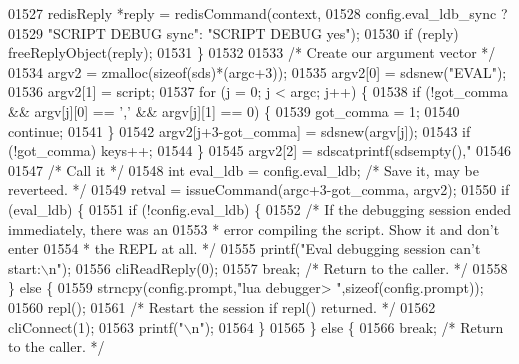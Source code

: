 \begin{DoxyCode}
{{{{{{{{{{{{{{{{{{{{{{{{{{{{{{{{{{{{{{{01527             redisReply *reply = redisCommand(context,
01528                     config.eval\_ldb\_sync ?
01529                     \textcolor{stringliteral}{"SCRIPT DEBUG sync"}: \textcolor{stringliteral}{"SCRIPT DEBUG yes"});
01530             \textcolor{keywordflow}{if} (reply) freeReplyObject(reply);
01531         \}
01532 
01533         \textcolor{comment}{/* Create our argument vector */}
01534         argv2 = zmalloc(\textcolor{keyword}{sizeof}(sds)*(argc+3));
01535         argv2[0] = sdsnew(\textcolor{stringliteral}{"EVAL"});
01536         argv2[1] = script;
01537         \textcolor{keywordflow}{for} (j = 0; j < argc; j++) \{
01538             \textcolor{keywordflow}{if} (!got\_comma && argv[j][0] == \textcolor{stringliteral}{','} && argv[j][1] == 0) \{
01539                 got\_comma = 1;
01540                 \textcolor{keywordflow}{continue};
01541             \}
01542             argv2[j+3-got\_comma] = sdsnew(argv[j]);
01543             \textcolor{keywordflow}{if} (!got\_comma) keys++;
01544         \}
01545         argv2[2] = sdscatprintf(sdsempty(),\textcolor{stringliteral}{"%
01546 
01547         \textcolor{comment}{/* Call it */}
01548         \textcolor{keywordtype}{int} eval\_ldb = config.eval\_ldb; \textcolor{comment}{/* Save it, may be reverteed. */}
01549         retval = issueCommand(argc+3-got\_comma, argv2);
01550         \textcolor{keywordflow}{if} (eval\_ldb) \{
01551             \textcolor{keywordflow}{if} (!config.eval\_ldb) \{
01552                 \textcolor{comment}{/* If the debugging session ended immediately, there was an}
01553 \textcolor{comment}{                 * error compiling the script. Show it and don't enter}
01554 \textcolor{comment}{                 * the REPL at all. */}
01555                 printf(\textcolor{stringliteral}{"Eval debugging session can't start:\(\backslash\)n"});
01556                 cliReadReply(0);
01557                 \textcolor{keywordflow}{break}; \textcolor{comment}{/* Return to the caller. */}
01558             \} \textcolor{keywordflow}{else} \{
01559                 strncpy(config.prompt,\textcolor{stringliteral}{"lua debugger> "},\textcolor{keyword}{sizeof}(config.prompt));
01560                 repl();
01561                 \textcolor{comment}{/* Restart the session if repl() returned. */}
01562                 cliConnect(1);
01563                 printf(\textcolor{stringliteral}{"\(\backslash\)n"});
01564             \}
01565         \} \textcolor{keywordflow}{else} \{
01566             \textcolor{keywordflow}{break}; \textcolor{comment}{/* Return to the caller. */}
}}}}}}}}}}}}}}}}}}}}}}}}}}}}}}}}}}}}}}}}
\end{DoxyCode}
